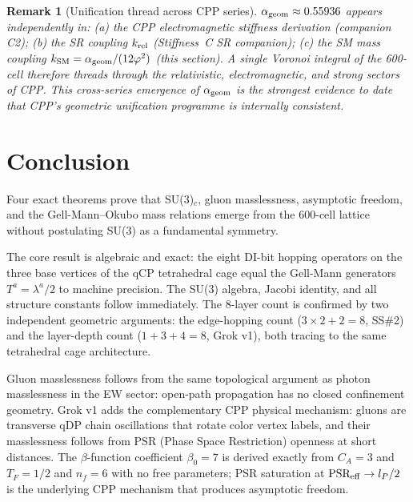 \documentclass[11pt,letterpaper]{article}
\newtheorem{remark}[theorem]{Remark}
\newcommand{\lP}{l_P}
\newcommand{\phig}{\varphi}
\begin{document}
\begin{remark}[Unification thread across CPP series]
$\alpha_{\rm geom} \approx 0.55936$ appears independently in:
(a) the CPP electromagnetic stiffness derivation (companion C2);
(b) the SR coupling $k_{\rm rel}$ (Stiffness~C SR companion);
(c) the SM mass coupling $k_{\rm SM} = \alpha_{\rm geom}/(12\phig^2)$
(this section).
A single Voronoi integral of the 600-cell therefore threads through
the relativistic, electromagnetic, and strong sectors of CPP.  This
cross-series emergence of $\alpha_{\rm geom}$ is the strongest
evidence to date that CPP's geometric unification programme is
internally consistent.
\end{remark}

\section{Conclusion}
\label{sec:conclusion}

Four exact theorems prove that SU(3)$_c$, gluon masslessness,
asymptotic freedom, and the Gell-Mann--Okubo mass relations emerge
from the 600-cell lattice without postulating SU(3) as a fundamental
symmetry.

The core result is algebraic and exact: the eight DI-bit hopping
operators on the three base vertices of the qCP tetrahedral cage
equal the Gell-Mann generators $T^a = \lambda^a/2$ to machine
precision.  The SU(3) algebra, Jacobi identity, and all structure
constants follow immediately.  The 8-layer count is confirmed by
two independent geometric arguments: the edge-hopping count
($3 \times 2 + 2 = 8$, SS\#2) and the layer-depth count
($1 + 3 + 4 = 8$, Grok v1), both tracing to the same tetrahedral
cage architecture.

Gluon masslessness follows from the same topological argument as
photon masslessness in the EW sector: open-path propagation has
no closed confinement geometry.  Grok v1 adds the complementary
CPP physical mechanism: gluons are transverse qDP chain oscillations
that rotate color vertex labels, and their masslessness follows
from PSR (Phase Space Restriction) openness at short distances.
The $\beta$-function coefficient $\beta_0 = 7$ is derived exactly
from $C_A = 3$ and $T_F = 1/2$ and $n_f = 6$ with no free parameters;
PSR saturation at $\text{PSR}_{\rm eff} \to \lP/2$ is the underlying
CPP mechanism that produces asymptotic freedom.
\end{document}
